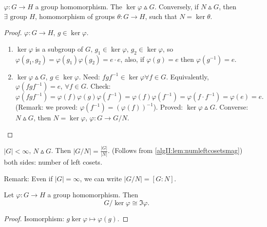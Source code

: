 \documentclass[10pt, a4paper]{article}
\begin{document}
\begin{lemma}
    $\varphi : G \to H$ a group homomorphism.
    The $\ker{\varphi} \vartriangle G$.
    Conversely,
    if $N \vartriangle G$,
    then $\exists \text{ group } H$,
    homomorphism of groups $\theta : G \to H$,
    such that $N = \ker{\theta}$.

    \begin{proof}
        $\varphi : G \to H$,
        $g \in \ker{\varphi}$.
        \begin{enumerate}[label = \roman*)]
            \item $\ker{\varphi}$ is a subgroup of $G$,
            $g_1 \in \ker{\varphi}$,
            $g_2 \in \ker{\varphi}$,
            so $\varphi(g_1, g_2) = \varphi(g_1)\varphi(g_2) = e \cdot e$,
            also,
            if $\varphi(g) = e$ then $\varphi(g ^ {-1}) = e$.
            \item $\ker{\varphi} \vartriangle G$,
            $g \in \ker{\varphi}$.
            Need:
            $fgf ^ {-1} \in \ker{\varphi} \forall f \in G$.
            Equivalently,
            $\varphi(fgf ^ {-1}) = e$,
            $\forall f \in G$.
            Check:
            \[
            \varphi(fgf ^ {-1}) = \varphi(f)\varphi(g)\varphi(f ^ {-1}) = \varphi(f)\varphi(f ^ {-1}) = \varphi(f\cdot f ^ {-1}) = \varphi(e) = e.
            \]
            (Remark:
            we proved:
            $\varphi(f ^ {-1}) = (\varphi(f)) ^ {-1}$).
            Proved:
            $\ker{\varphi} \vartriangle G$.
            Converse:
            $N \vartriangle G$,
            then $N = \ker{\varphi}$,
            $\varphi : G \to G / N$.
        \end{enumerate}
    \end{proof}
\end{lemma}

\begin{lemma}
    $|G| < \infty$,
    $N \vartriangle G$.
    Then $|G / N| = \frac{|G|}{|N|}$.
    (Follows from \autoref{algII:lem:numleftcosetsmag})
    both sides:
    number of left cosets.
\end{lemma}

Remark:
Even if $|G| = \infty$,
we can write $|G / N| = [G : N]$.

\begin{theorem}
    Let $\varphi : G \to H$ a group homomorphism.
    Then
    \[
    G / \ker{\varphi} \cong \Im{\varphi}.
    \]
    
    \begin{proof}
        Isomorphism:
        $g\ker{\varphi} \mapsto \varphi(g)$.
    \end{proof}
\end{theorem}
\end{document}
